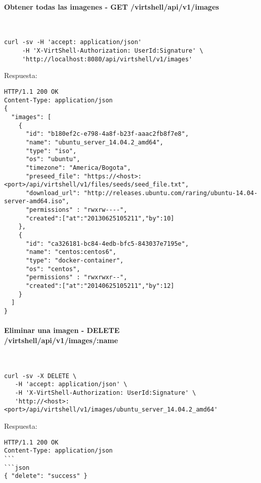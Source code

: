 \paragraph{Obtener todas las imagenes - GET /virtshell/api/v1/images} ~\\

\begin{lstlisting}[style=json]
curl -sv -H 'accept: application/json' 
     -H 'X-VirtShell-Authorization: UserId:Signature' \ 
     'http://localhost:8080/api/virtshell/v1/images'
\end{lstlisting}

\vspace{1cm}
Respuesta:
\vspace{1cm}

\begin{lstlisting}[style=json]
HTTP/1.1 200 OK
Content-Type: application/json
{
  "images": [
    {
      "id": "b180ef2c-e798-4a8f-b23f-aaac2fb8f7e8",
      "name": "ubuntu_server_14.04.2_amd64",
      "type": "iso",
      "os": "ubuntu",  
      "timezone": "America/Bogota", 
      "preseed_file": "https://<host>:<port>/api/virtshell/v1/files/seeds/seed_file.txt",
      "download_url": "http://releases.ubuntu.com/raring/ubuntu-14.04-server-amd64.iso",
      "permissions" : "rwxrw----",
      "created":["at":"20130625105211","by":10]
    },
    {
      "id": "ca326181-bc84-4edb-bfc5-843037e7195e",
      "name": "centos:centos6",
      "type": "docker-container",
      "os": "centos", 
      "permissions" : "rwxrwxr--",
      "created":["at":"20140625105211","by":12]
    }
  ]
}  
\end{lstlisting}

\paragraph{Eliminar una imagen - DELETE \\ /virtshell/api/v1/images/:name} ~\\

\begin{lstlisting}[style=json]
curl -sv -X DELETE \
   -H 'accept: application/json' \
   -H 'X-VirtShell-Authorization: UserId:Signature' \
   'http://<host>:<port>/api/virtshell/v1/images/ubuntu_server_14.04.2_amd64'
\end{lstlisting}

\vspace{1cm}
Respuesta:
\vspace{1cm}

\begin{lstlisting}[style=json]
HTTP/1.1 200 OK
Content-Type: application/json
```
```json
{ "delete": "success" }
\end{lstlisting}
